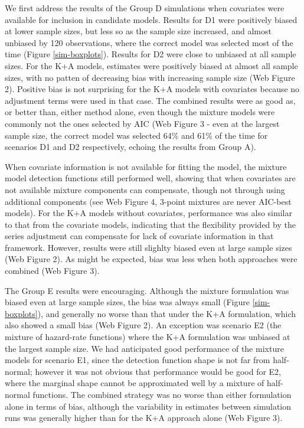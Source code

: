 \documentclass[useAMS,referee,usenatbib]{biom}
\begin{document}
We first address the results of the Group D simulations when covariates were available for inclusion in candidate models. Results for D1 were positively biased at lower sample sizes, but less so as the sample size increased, and almost unbiased by 120 observations, where the correct model was selected most of the time (Figure \ref{sim-boxplots}).  Results for D2 were close to unbiased at all sample sizes.  For the K+A models, estimates were positively biased at almost all sample sizes, with no patten of decreasing bias with increasing sample size (Web Figure 2).  Positive bias is not surprising for the K+A models with covariates because no adjustment terms were used in that case.  The combined results were as good as, or better than, either method alone, even though the mixture models were commonly not the ones selected by AIC (Web Figure 3 - even at the largest sample size, the correct model was selected 64\% and 61\% of the time for scenarios D1 and D2 respectively, echoing the results from Group A). 

When covariate information is not available for fitting the model, the mixture model detection functions still performed well, showing that when covariates are not available mixture components can compensate, though not through using additional components (see Web Figure 4, 3-point mixtures are never AIC-best models).  For the K+A models without covariates, performance was also similar to that from the covariate models, indicating that the flexibility provided by the series adjustment can compensate for lack of covariate information in that framework.  However, results were still slighlty biased even at large sample sizes (Web Figure 2).  As might be expected, bias was less when both approaches were combined (Web Figure 3).

The Group E results were encouraging.  Although the mixture formulation was biased even at large sample sizes, the bias was always small (Figure \ref{sim-boxplots}), and generally no worse than that under the K+A formulation, which also showed a small bias (Web Figure 2).  An exception was scenario E2 (the mixture of hazard-rate functions) where the K+A formulation was unbiased at the largest sample size.  We had anticipated good performance of the mixture models for scenario E1, since the detection function shape is not far from half-normal; however it was not obvious that performance would be good for E2, where the marginal shape cannot be approximated well by a mixture of half-normal functions.  The combined strategy was no worse than either formulation alone in terms of bias, although the variability in estimates between simulation runs was generally higher than for the K+A approach alone (Web Figure 3).  
\end{document}
